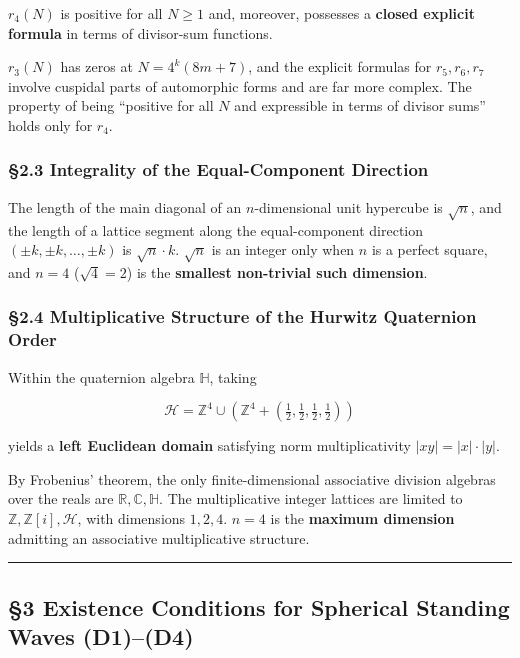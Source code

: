 \documentclass[
  a4paper,11pt]{article}
\theoremstyle{definition}
\theoremstyle{remark}
\begin{document}
\(r_4(N)\) is positive for all \(N \geq 1\) and, moreover, possesses a
\textbf{closed explicit formula} in terms of divisor-sum functions.

\(r_3(N)\) has zeros at \(N = 4^k(8m+7)\), and the explicit formulas for
\(r_5, r_6, r_7\) involve cuspidal parts of automorphic forms and are
far more complex. The property of being ``positive for all \(N\) and
expressible in terms of divisor sums'' holds only for \(r_4\).

\subsubsection{§2.3 Integrality of the Equal-Component
Direction}\label{integrality-of-the-equal-component-direction}

The length of the main diagonal of an \(n\)-dimensional unit hypercube
is \(\sqrt{n}\), and the length of a lattice segment along the
equal-component direction \((\pm k, \pm k, \ldots, \pm k)\) is
\(\sqrt{n} \cdot k\). \(\sqrt{n}\) is an integer only when \(n\) is a
perfect square, and \(n = 4\) (\(\sqrt{4} = 2\)) is the \textbf{smallest
non-trivial such dimension}.

\subsubsection{§2.4 Multiplicative Structure of the Hurwitz Quaternion
Order}\label{multiplicative-structure-of-the-hurwitz-quaternion-order}

Within the quaternion algebra \(\mathbb{H}\), taking

\[\mathcal{H} = \mathbb{Z}^4 \cup \left(\mathbb{Z}^4 + \left(\tfrac{1}{2}, \tfrac{1}{2}, \tfrac{1}{2}, \tfrac{1}{2}\right)\right)\]

yields a \textbf{left Euclidean domain} satisfying norm multiplicativity
\(|xy| = |x| \cdot |y|\).

By Frobenius' theorem, the only finite-dimensional associative division
algebras over the reals are \(\mathbb{R}, \mathbb{C}, \mathbb{H}\). The
multiplicative integer lattices are limited to
\(\mathbb{Z}, \mathbb{Z}[i], \mathcal{H}\), with dimensions \(1, 2, 4\).
\(n = 4\) is the \textbf{maximum dimension} admitting an associative
multiplicative structure.

\begin{center}\rule{0.5\linewidth}{0.5pt}\end{center}

\subsection{§3 Existence Conditions for Spherical Standing Waves
(D1)--(D4)}\label{existence-conditions-for-spherical-standing-waves-d1d4}
\end{document}
